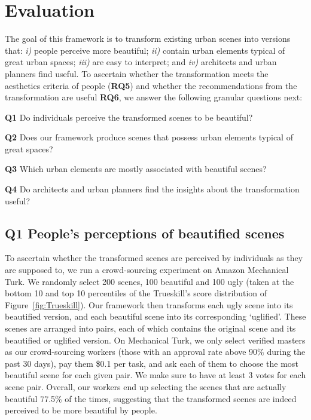 



\section{Evaluation}
\label{sec:evaluation}

The goal of this framework is to transform existing urban scenes into versions that: \emph{i)} people perceive more beautiful; \emph{ii)} contain urban elements typical of great urban spaces; \emph{iii)} are easy to interpret; and \emph{iv)} architects and urban planners find useful. To ascertain whether the transformation meets the aesthetics criteria of people (\textbf{RQ5}) and whether the recommendations from the transformation are useful \textbf{RQ6}, we answer the following granular questions next: 

\begin{description}
    \item{\textbf{Q1}} Do individuals perceive the transformed scenes to be beautiful?
    \item{\textbf{Q2}}  Does our framework produce scenes that possess urban elements typical of great spaces?  
    \item{\textbf{Q3}}  Which urban elements are mostly associated with beautiful scenes?    
    \item{\textbf{Q4}}  Do architects and urban planners find the insights about the transformation useful?    
\end{description}


\subsection{Q1 People's perceptions of beautified scenes}
To ascertain whether the transformed scenes are perceived by individuals as they are supposed to, we run a crowd-sourcing experiment on Amazon Mechanical Turk.  We randomly select 200 scenes, 100 beautiful and 100 ugly  (taken at the bottom 10 and top 10 percentiles of the Trueskill's score distribution of Figure~\ref{fig:Trueskill}). Our framework then transforms each ugly scene into its beautified version, and each beautiful scene into its corresponding `uglified'. These scenes are arranged into pairs, each of which contains the original scene and its beautified or uglified version. On  Mechanical Turk, we only select verified masters as our crowd-sourcing workers (those with an approval rate above 90\% during the past 30 days), pay them \$0.1 per  task,  and ask each of them to choose the most beautiful scene for each given pair.  We make sure to have at least 3 votes for each scene pair. Overall, our workers end up selecting the scenes that are actually beautiful 77.5\% of the times, suggesting that the transformed scenes are indeed perceived to be more beautiful by people. 

